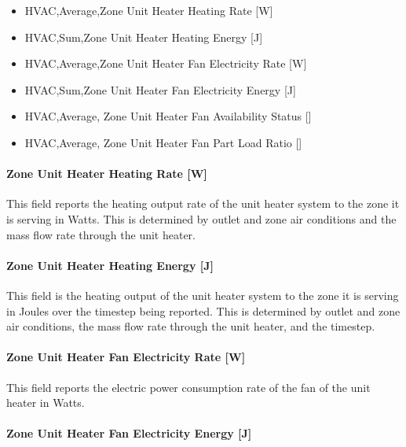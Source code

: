 \begin{itemize}
\item
  HVAC,Average,Zone Unit Heater Heating Rate {[}W{]}
\item
  HVAC,Sum,Zone Unit Heater Heating Energy {[}J{]}
\item
  HVAC,Average,Zone Unit Heater Fan Electricity Rate {[}W{]}
\item
  HVAC,Sum,Zone Unit Heater Fan Electricity Energy {[}J{]}
\item
  HVAC,Average, Zone Unit Heater Fan Availability Status {[]}
\item
  HVAC,Average, Zone Unit Heater Fan Part Load Ratio {[]}
\end{itemize}

\paragraph{Zone Unit Heater Heating Rate {[}W{]}}\label{zone-unit-heater-heating-rate-w}

This field reports the heating output rate of the unit heater system to the zone it is serving in Watts. This is determined by outlet and zone air conditions and the mass flow rate through the unit heater.

\paragraph{Zone Unit Heater Heating Energy {[}J{]}}\label{zone-unit-heater-heating-energy-j}

This field is the heating output of the unit heater system to the zone it is serving in Joules over the timestep being reported. This is determined by outlet and zone air conditions, the mass flow rate through the unit heater, and the timestep.

\paragraph{Zone Unit Heater Fan Electricity Rate {[}W{]}}\label{zone-unit-heater-fan-electric-power-w}

This field reports the electric power consumption rate of the fan of the unit heater in Watts.

\paragraph{Zone Unit Heater Fan Electricity Energy {[}J{]}}\label{zone-unit-heater-fan-electric-energy-j}

